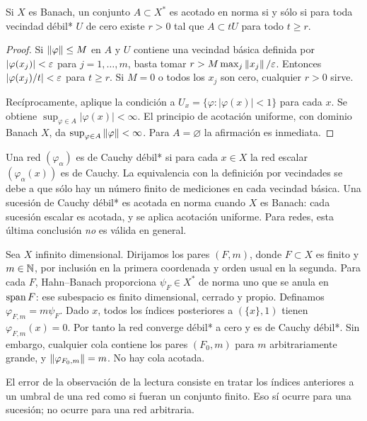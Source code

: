 \begin{proposicion}\label{v3:acotacion-debil-estrella}
Si $X$ es Banach, un conjunto $A\subset X^*$ es acotado en norma si y sólo si para toda vecindad débil* $U$ de cero existe $r>0$ tal que $A\subset tU$ para todo $t\geq r$.
\end{proposicion}
\begin{proof}
Si $\left\lVert\varphi\right\rVert\leq M$ en $A$ y $U$ contiene una vecindad básica definida por $|\varphi(x_j)|<\varepsilon$ para $j=1,\ldots,m$, basta tomar $r>M\max_j\left\lVert x_j\right\rVert/\varepsilon$. Entonces $|\varphi(x_j)/t|<\varepsilon$ para $t\geq r$. Si $M=0$ o todos los $x_j$ son cero, cualquier $r>0$ sirve.

Recíprocamente, aplique la condición a $U_x=\{\varphi:|\varphi(x)|<1\}$ para cada $x$. Se obtiene $\sup_{\varphi\in A}|\varphi(x)|<\infty$. El principio de acotación uniforme, con dominio Banach $X$, da $\sup_{\varphi\in A}\left\lVert\varphi\right\rVert<\infty$. Para $A=\varnothing$ la afirmación es inmediata.
\end{proof}

Una red $(\varphi_\alpha)$ es de Cauchy débil* si para cada $x\in X$ la red escalar $(\varphi_\alpha(x))$ es de Cauchy. La equivalencia con la definición por vecindades se debe a que sólo hay un número finito de mediciones en cada vecindad básica. Una sucesión de Cauchy débil* es acotada en norma cuando $X$ es Banach: cada sucesión escalar es acotada, y se aplica acotación uniforme. Para redes, esta última conclusión \emph{no} es válida en general.

\begin{ejemplo}\label{v3:red-no-acotada}
Sea $X$ infinito dimensional. Dirijamos los pares $(F,m)$, donde $F\subset X$ es finito y $m\in\mathbb N$, por inclusión en la primera coordenada y orden usual en la segunda. Para cada $F$, Hahn--Banach proporciona $\psi_F\in X^*$ de norma uno que se anula en $\operatorname{span} F$: ese subespacio es finito dimensional, cerrado y propio. Definamos $\varphi_{F,m}=m\psi_F$. Dado $x$, todos los índices posteriores a $(\{x\},1)$ tienen $\varphi_{F,m}(x)=0$. Por tanto la red converge débil* a cero y es de Cauchy débil*. Sin embargo, cualquier cola contiene los pares $(F_0,m)$ para $m$ arbitrariamente grande, y $\left\lVert\varphi_{F_0,m}\right\rVert=m$. No hay cola acotada.

El error de la observación de la lectura consiste en tratar los índices anteriores a un umbral de una red como si fueran un conjunto finito. Eso sí ocurre para una sucesión; no ocurre para una red arbitraria.
\end{ejemplo}

